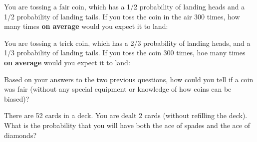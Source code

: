 \documentclass[12pt]{exam}
\begin{document}
\begin{questions}
		
	
	\clearpage
\question You are tossing a fair coin, which has a 1/2 probability of landing heads and a 1/2 probability of landing tails. If you toss the coin in the air 300 times, how many times \textbf{on average} would you expect it to land:
\question You are tossing a trick coin, which has a 2/3 probability of landing heads, and a 1/3 probability of landing tails. If you toss the coin 300 times, hoe many times \textbf{on average}	 would you expect it to land:
	
\question Based on your answers to the two previous questions, how could you tell if a coin was fair (without any special equipment or knowledge of how coins can be biased)?
	\vspace{1in}
	
	\question There are 52 cards in a deck. You are dealt 2 cards (without refilling the deck). What is the probability that you will have both the ace of spades and the ace of diamonds?
		\vspace{1in}
	

\end{questions}
\end{document}
